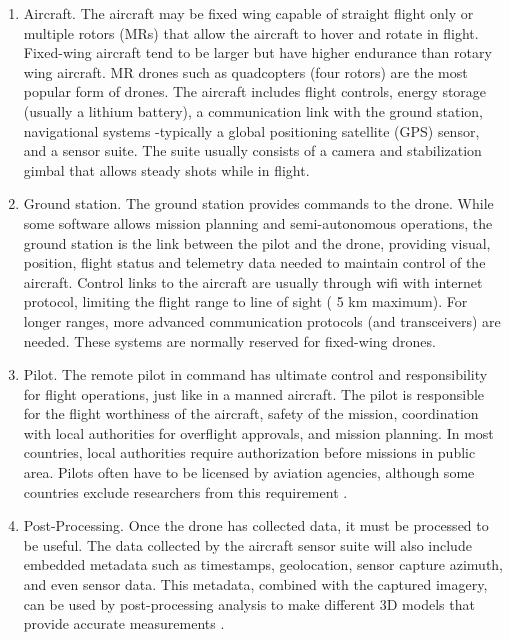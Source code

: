 \begin{enumerate}
\item Aircraft. The aircraft may be fixed wing capable of straight flight only or multiple rotors (MRs) that allow the aircraft to hover and rotate in flight. Fixed-wing aircraft tend to be larger but have higher endurance than rotary wing aircraft. MR drones such as quadcopters (four rotors) are the most popular form of drones. The aircraft includes flight controls, energy storage (usually a lithium battery), a communication link with the ground station, navigational systems -typically a global positioning satellite (GPS) sensor, and a sensor suite. The suite usually consists of a camera and stabilization gimbal that allows steady shots while in flight. 

\item Ground station. The ground station provides commands to the drone. While some software allows mission planning and semi-autonomous operations, the ground station is the link between the pilot and the drone, providing visual, position, flight status and telemetry data needed to maintain control of the aircraft. Control links to the aircraft are usually through wifi with internet protocol, limiting the flight range to line of sight ( 5 km maximum). For longer ranges, more advanced communication protocols (and transceivers) are needed. These systems are normally reserved for fixed-wing drones.

\item Pilot. The remote pilot in command has ultimate control and responsibility for flight operations, just like in a manned aircraft. The pilot is responsible for the flight worthiness of the aircraft, safety of the mission, coordination with local authorities for overflight approvals, and mission planning. In most countries, local authorities require authorization before missions in public area. Pilots often have to be licensed by aviation agencies, although some countries exclude researchers from this requirement \citep{UAVCoach2017}.

\item Post-Processing. Once the drone has collected data, it must be processed to be useful. The data collected by the aircraft sensor suite will also include embedded metadata such as timestamps, geolocation, sensor capture azimuth, and even sensor data. This metadata, combined with the captured imagery, can be used by post-processing analysis to make different 3D models that provide accurate measurements \citep{Sona2014}. 

\end{enumerate}

